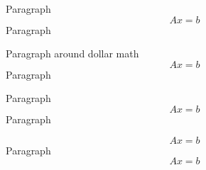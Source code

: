 Paragraph
\begin{equation}
Ax=b
\end{equation}
Paragraph

Paragraph around dollar math
\begin{equation}
Ax=b
\end{equation}
Paragraph

Paragraph
\begin{equation}
Ax=b
\end{equation}
Paragraph

\begin{equation}
Ax=b
\end{equation}
Paragraph
\begin{equation}
Ax=b
\end{equation}